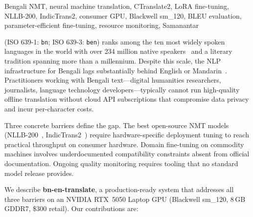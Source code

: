 \documentclass[journal]{IEEEtran}
\begin{document}
\begin{IEEEkeywords}
Bengali NMT, neural machine translation, CTranslate2, LoRA fine-tuning, NLLB-200,
IndicTrans2, consumer GPU, Blackwell sm\_120, BLEU evaluation, parameter-efficient
fine-tuning, resource monitoring, Samanantar
\end{IEEEkeywords}


 (ISO 639-1: \texttt{bn}; ISO 639-3: \texttt{ben}) ranks
among the ten most widely spoken languages in the world with over 234 million
native speakers~\cite{ethnologue2023} and a literary tradition spanning more than
a millennium.
Despite this scale, the NLP infrastructure for Bengali lags substantially behind
English or Mandarin~\cite{hasan2020xl}.
Practitioners working with Bengali text---digital humanities researchers,
journalists, language technology developers---typically cannot run high-quality
offline translation without cloud API subscriptions that compromise data privacy
and incur per-character costs.

Three concrete barriers define the gap.
The best open-source NMT models (NLLB-200~\cite{nllb2022}, IndicTrans2~\cite{gala2023indictrans2})
require hardware-specific deployment tuning to reach practical throughput on
consumer hardware.
Domain fine-tuning on commodity machines involves underdocumented compatibility
constraints absent from official documentation.
Ongoing quality monitoring requires tooling that no standard model release provides.

We describe \textbf{bn-en-translate}, a production-ready system that addresses all
three barriers on an NVIDIA RTX~5050 Laptop GPU (Blackwell sm\_120, 8\,GB GDDR7,
\$300 retail).
Our contributions are:
\end{document}
